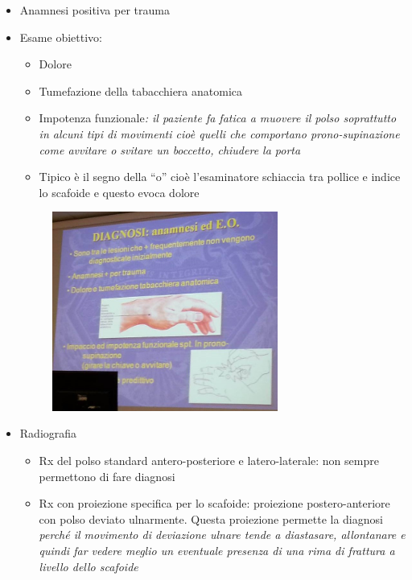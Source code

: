 \begin{itemize}
\item
  Anamnesi positiva per trauma
\item
  Esame obiettivo:
\begin{itemize}
\item
  Dolore
\item
  Tumefazione della tabacchiera anatomica
\item
  Impotenza funzionale\emph{: il paziente fa fatica a muovere il polso soprattutto in alcuni tipi di movimenti cioè quelli che comportano prono-supinazione come avvitare o svitare un boccetto, chiudere la porta}
\item
  Tipico è il segno della ``o'' cioè l'esaminatore schiaccia tra pollice e indice lo scafoide e questo evoca dolore
\end{itemize}

\begin{figure}[!ht]
\centering
\includegraphics[width=0.7\textwidth]{003/image10.jpeg}
\end{figure}

\item
  Radiografia

\begin{itemize}
\item
  Rx del polso standard antero-posteriore e latero-laterale: non sempre permettono di fare diagnosi
\item
  Rx con proiezione specifica per lo scafoide: proiezione postero-anteriore con polso deviato ulnarmente. Questa proiezione permette la diagnosi \emph{perché il movimento di deviazione ulnare tende a diastasare, allontanare e quindi far vedere meglio un eventuale presenza di una rima di frattura a livello dello scafoide}
\end{itemize}
\end{itemize}

